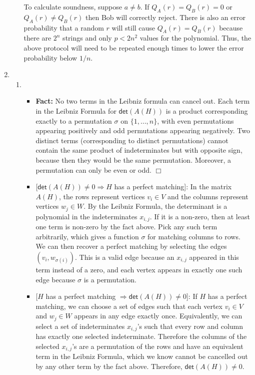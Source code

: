 \documentclass[12pt]{article}
\begin{document}
\begin{enumerate}
\begin{enumerate}
To calculate soundness, suppose $a \ne b$. If $Q_A(r) = Q_B(r) = 0$ or
$Q_A(r) \ne Q_B(r)$ then Bob will correctly reject.
There is also an error probability that a random $r$ will still
cause $Q_A(r) = Q_B(r)$ because there are $2^n$ strings and only
$p < 2n^2$ values for the polynomial. Thus, the above protocol will need
to be repeated enough times to lower the error probability below $1/n$.

\end{enumerate}

\pagebreak
\item %

\begin{enumerate}

\item %

\begin{itemize}
\item
\textbf{Fact:} No two terms in the Leibniz formula can cancel out.
Each term in the Leibniz Formula for $\textsf{det}(A(H))$ is a product
corresponding exactly to a permutation $\sigma$
on $\{1,\ldots,n\}$, with even permutations appearing positively and odd
permutations appearing negatively. Two distinct terms (corresponding to
distinct permutations) cannot contain the same
product of indeterminates but with
opposite sign, because then they would be the same permutation.
Moreover, a permutation can only be even or odd. $\Box$

\item

[$\textsf{det}(A(H)) \ne 0 \Rightarrow H$ has a perfect matching]:
In the matrix $A(H)$, the rows represent vertices $v_i \in V$ and
the columns represent vertices $w_j \in W$.
By the Leibniz Formula, the determinant is a polynomial in the
indeterminates $x_{i,j}$. If it is a non-zero, then at least one
term is non-zero by the fact above.
Pick any such term arbitrarily, which gives a function
$\sigma$ for matching columns to rows.
We can then recover
a perfect matching by selecting the edges $(v_i,w_{\sigma(i)})$. This is
a valid edge because an $x_{i,j}$ appeared in this term instead of a zero,
and each vertex appears in exactly one such edge because $\sigma$ is a
permutation.

\item

[$H$ has a perfect matching $\Rightarrow \textsf{det}(A(H)) \ne 0$]:
If $H$ has a perfect matching, we can choose a set of edges such that
each vertex $v_i \in V$ and $w_j \in W$ appears in any edge exactly once.
Equivalently, we can select a set of indeterminates $x_{i,j}$'s such that every
row and column has exactly one selected indeterminate. Therefore the
columns of the selected $x_{i,j}$'s are a permutation of the rows and have
an equivalent term in the Leibniz Formula, which we know cannot be cancelled
out by any other term by the fact above. Therefore,
$\textsf{det}(A(H)) \ne 0$.


\end{itemize}
\end{enumerate}
\end{enumerate}
\end{document}
